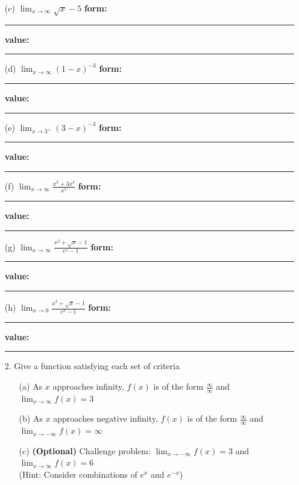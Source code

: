 \documentclass[10pt]{article}
\begin{document}
\begin{enumerate}
\begin{enumerate}
    \item[(c)] $\displaystyle\lim_{x \rightarrow \infty} \sqrt{x} - 5$ \hfill {\bf form:}\rule[-8pt]{0.5in}{0.4pt} \hfill {\bf value:}\rule[-8pt]{0.5in}{0.4pt}
        \vfill

    \item[(d)] $\displaystyle\lim_{x \rightarrow \infty} (1-x)^{-3}$ \hfill {\bf form:}\rule[-8pt]{0.5in}{0.4pt} \hfill {\bf value:}\rule[-8pt]{0.5in}{0.4pt}
        \vfill

    \item[(e)] $\displaystyle\lim_{x \rightarrow 3^+} (3-x)^{-3}$ \hfill {\bf form:}\rule[-8pt]{0.5in}{0.4pt} \hfill {\bf value:}\rule[-8pt]{0.5in}{0.4pt}
        \vfill

    \item[(f)] $\displaystyle\lim_{x \rightarrow \infty} \frac{x^2 + 3x^4}{x^5}$ \hfill {\bf form:}\rule[-8pt]{0.5in}{0.4pt} \hfill {\bf value:}\rule[-8pt]{0.5in}{0.4pt}
        \vfill


    \item[(g)] $\displaystyle\lim_{x\to\infty}\frac{x^2+\sqrt{x}-1}{e^x-1}$ \hfill {\bf form:}\rule[-8pt]{0.5in}{0.4pt} \hfill {\bf value:}\rule[-8pt]{0.5in}{0.4pt}
        \vfill

    \item[(h)] $\displaystyle\lim_{x\to0}\frac{x^2+\sqrt{x}-1}{e^x-1}$ \hfill {\bf form:}\rule[-8pt]{0.5in}{0.4pt} \hfill {\bf value:}\rule[-8pt]{0.5in}{0.4pt}
        \vfill
    \end{enumerate}
\end{enumerate}

\newpage%


\begin{enumerate}
\item[2.]\reversemarginpar{} Give a function satisfying each set of criteria
    \begin{enumerate}
    \item[(a)] As $x$ approaches infinity, $f(x)$ is of the form $\frac \infty \infty$ and $\lim_{x\to \infty}f(x) = 3$
        \vfill

    \item[(b)] As $x$ approaches negative infinity, $f(x)$ is of the form $\frac \infty \infty$ and $\lim_{x\to -\infty}f(x) = \infty$ 
        \vfill

    \item[(c)] \textbf{(Optional)} Challenge problem: $\lim_{x\to -\infty}f(x) = 3$ and $\lim_{x\to \infty}f(x) = 6$ \\(Hint: Consider combinations of $e^x$ and $e^{-x}$)
        \vfill
    \end{enumerate}
\end{enumerate}
\end{document}
